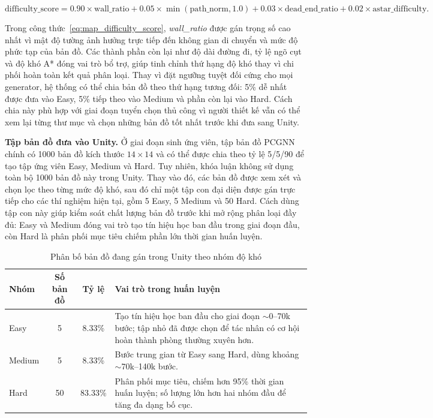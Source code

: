 \begin{equation}
    \text{difficulty\_score}
    = 0.90 \times \text{wall\_ratio}
    + 0.05 \times \min(\text{path\_norm}, 1.0)
    + 0.03 \times \text{dead\_end\_ratio}
    + 0.02 \times \text{astar\_difficulty}.
    \label{eq:map_difficulty_score}
\end{equation}

Trong công thức~\ref{eq:map_difficulty_score}, \emph{wall\_ratio} được gán trọng số cao nhất vì mật độ tường ảnh hưởng trực tiếp đến không gian di chuyển và mức độ phức tạp của bản đồ. Các thành phần còn lại như độ dài đường đi, tỷ lệ ngõ cụt và độ khó A* đóng vai trò bổ trợ, giúp tinh chỉnh thứ hạng độ khó thay vì chi phối hoàn toàn kết quả phân loại. Thay vì đặt ngưỡng tuyệt đối cứng cho mọi generator, hệ thống có thể chia bản đồ theo thứ hạng tương đối: 5\% dễ nhất được đưa vào Easy, 5\% tiếp theo vào Medium và phần còn lại vào Hard. Cách chia này phù hợp với giai đoạn tuyển chọn thủ công vì người thiết kế vẫn có thể xem lại từng thư mục và chọn những bản đồ tốt nhất trước khi đưa sang Unity.

\textbf{Tập bản đồ đưa vào Unity.} Ở giai đoạn sinh ứng viên, tập bản đồ PCGNN chính có 1000 bản đồ kích thước $14\times14$ và có thể được chia theo tỷ lệ 5/5/90 để tạo tập ứng viên Easy, Medium và Hard. Tuy nhiên, khóa luận không sử dụng toàn bộ 1000 bản đồ này trong Unity. Thay vào đó, các bản đồ được xem xét và chọn lọc theo từng mức độ khó, sau đó chỉ một tập con đại diện được gán trực tiếp cho các thí nghiệm hiện tại, gồm 5 Easy, 5 Medium và 50 Hard. Cách dùng tập con này giúp kiểm soát chất lượng bản đồ trước khi mở rộng phân loại đầy đủ: Easy và Medium đóng vai trò tạo tín hiệu học ban đầu trong giai đoạn đầu, còn Hard là phân phối mục tiêu chiếm phần lớn thời gian huấn luyện.

\begin{table}[H]
    \centering
    \small
    \caption{Phân bố bản đồ đang gán trong Unity theo nhóm độ khó}
    \label{tab:map_split}
    \begin{tabular}{|p{2.5cm}|c|c|p{7.5cm}|}
        \hline
        \textbf{Nhóm} & \textbf{Số bản đồ} & \textbf{Tỷ lệ} & \textbf{Vai trò trong huấn luyện} \\
        \hline
        Easy   & 5  & 8.33\%  & Tạo tín hiệu học ban đầu cho giai đoạn $\sim$0--70k bước; tập nhỏ đã được chọn để tác nhân có cơ hội hoàn thành phòng thường xuyên hơn. \\
        \hline
        Medium & 5  & 8.33\%  & Bước trung gian từ Easy sang Hard, dùng khoảng $\sim$70k--140k bước. \\
        \hline
        Hard   & 50 & 83.33\% & Phân phối mục tiêu, chiếm hơn 95\% thời gian huấn luyện; số lượng lớn hơn hai nhóm đầu để tăng đa dạng bố cục. \\
        \hline
    \end{tabular}
\end{table}

